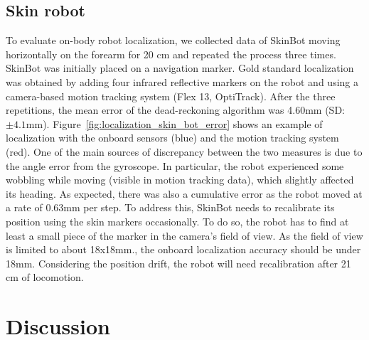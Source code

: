 \subsection{Skin robot}
To evaluate on-body robot localization, we collected data of SkinBot moving horizontally on the forearm for 20 cm and repeated the process three times. SkinBot was initially placed on a navigation marker. Gold standard localization was obtained by adding four infrared reflective markers on the robot and using a camera-based motion tracking system (Flex 13, OptiTrack). After the three repetitions, the mean error of the dead-reckoning algorithm was 4.60mm (SD:$\pm4.1$mm). Figure~\ref{fig:localization_skin_bot_error} shows an example of localization with the onboard sensors (blue) and the motion tracking system (red). One of the main sources of discrepancy between the two measures is due to the angle error from the gyroscope. In particular, the robot experienced some wobbling while moving (visible in motion tracking data), which slightly affected its heading. As expected, there was also a cumulative error as the robot moved at a rate of 0.63mm per step. To address this, SkinBot needs to recalibrate its position using the skin markers occasionally. To do so, the robot has to find at least a small piece of the marker in the camera's field of view. As the field of view is limited to about 18x18mm., the onboard localization accuracy should be under 18mm. Considering the position drift, the robot will need recalibration after 21 cm of locomotion.







\section{Discussion}




